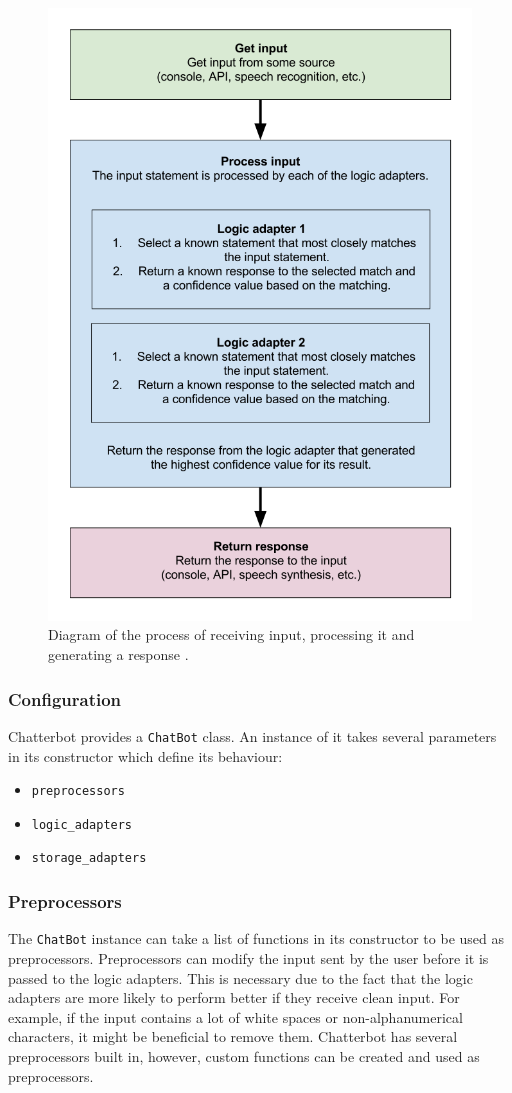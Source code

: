 \documentclass[12pt,a4paper]{article}
\newcommand{\captionstyle}[1] {
    \small{#1}
}
\begin{document}
\begin{figure}[!htb]%
    \centering
    \includegraphics[width=0.6\columnwidth]{chatterbot-process-flow}%
    \caption{\captionstyle{Diagram of the process of receiving input, processing it and generating a response \citep{Chatterbot:online}.}}%
    \label{fig:chatterbot-process-flow}%
\end{figure}

\subsubsection{Configuration}
Chatterbot provides a \texttt{ChatBot} class. An instance of it takes several parameters in its constructor which define its behaviour:
\begin{itemize}
    \item \texttt{preprocessors}
    \item \texttt{logic\_adapters}
    \item \texttt{storage\_adapters}
\end{itemize}

\subsubsection{Preprocessors}
The \texttt{ChatBot} instance can take a list of functions in its constructor to be used as preprocessors. Preprocessors can modify the input sent by the user before it is passed to the logic adapters. This is necessary due to the fact that the logic adapters are more likely to perform better if they receive clean input. For example, if the input contains a lot of white spaces or non-alphanumerical characters, it might be beneficial to remove them. Chatterbot has several preprocessors built in, however, custom functions can be created and used as preprocessors.
\end{document}
